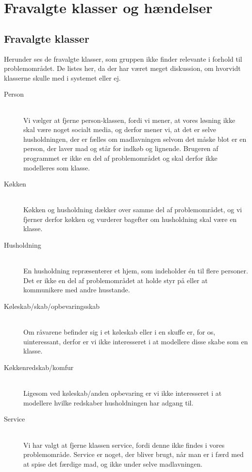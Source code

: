 \chapter{Fravalgte klasser og hændelser}
\label{ap:fravalgteklasseroghaendelser}

\section{Fravalgte klasser}
Herunder ses de fravalgte klasser, som gruppen ikke finder relevante i forhold til problemområdet. De listes her, da der har været meget diskussion, om hvorvidt klasserne skulle med i systemet eller ej. 

\begin{description}
\item[Person] \hfill \\
Vi vælger at fjerne person-klassen, fordi vi mener, at vores løsning ikke skal være noget socialt media, og derfor mener vi, at det er selve husholdningen, der er fælles om madlavningen selvom det måske blot er en person, der laver mad og står for indkøb og lignende. Brugeren af programmet er ikke en del af problemområdet og skal derfor ikke modelleres som klasse.

\item[Køkken] \hfill \\
Køkken og husholdning dækker over samme del af problemområdet, og vi fjerner derfor køkken og vurderer bagefter om husholdning skal være en klasse.

\item[Husholdning] \hfill \\
En husholdning repræsenterer et hjem, som indeholder én til flere personer. Det er ikke en del af problemområdet at holde styr på eller at kommunikere med andre husstande.

\item[Køleskab/skab/opbevaringsskab] \hfill \\
Om råvarene befinder sig i et køleskab eller i en skuffe er, for os, uinteressant, derfor er vi ikke interesseret i at modellere disse skabe som en klasse.

\item[Køkkenredskab/komfur] \hfill \\
Ligesom ved køleskab/anden opbevaring er vi ikke interesseret i at modellere hvilke redskaber husholdningen har adgang til.

\item[Service] \hfill \\ 
Vi har valgt at fjerne klassen service, fordi denne ikke findes i vores problemområde. Service er noget, der bliver brugt, når man er i færd med at spise det færdige mad, og ikke under selve madlavningen.


\end{description}
